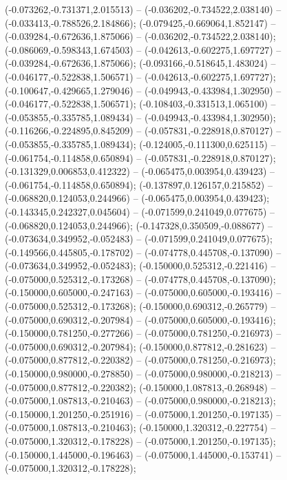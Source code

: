  (-0.073262,-0.731371,2.015513) -- (-0.036202,-0.734522,2.038140) -- (-0.033413,-0.788526,2.184866);
 (-0.079425,-0.669064,1.852147) -- (-0.039284,-0.672636,1.875066) -- (-0.036202,-0.734522,2.038140);
 (-0.086069,-0.598343,1.674503) -- (-0.042613,-0.602275,1.697727) -- (-0.039284,-0.672636,1.875066);
 (-0.093166,-0.518645,1.483024) -- (-0.046177,-0.522838,1.506571) -- (-0.042613,-0.602275,1.697727);
 (-0.100647,-0.429665,1.279046) -- (-0.049943,-0.433984,1.302950) -- (-0.046177,-0.522838,1.506571);
 (-0.108403,-0.331513,1.065100) -- (-0.053855,-0.335785,1.089434) -- (-0.049943,-0.433984,1.302950);
 (-0.116266,-0.224895,0.845209) -- (-0.057831,-0.228918,0.870127) -- (-0.053855,-0.335785,1.089434);
 (-0.124005,-0.111300,0.625115) -- (-0.061754,-0.114858,0.650894) -- (-0.057831,-0.228918,0.870127);
 (-0.131329,0.006853,0.412322) -- (-0.065475,0.003954,0.439423) -- (-0.061754,-0.114858,0.650894);
 (-0.137897,0.126157,0.215852) -- (-0.068820,0.124053,0.244966) -- (-0.065475,0.003954,0.439423);
 (-0.143345,0.242327,0.045604) -- (-0.071599,0.241049,0.077675) -- (-0.068820,0.124053,0.244966);
 (-0.147328,0.350509,-0.088677) -- (-0.073634,0.349952,-0.052483) -- (-0.071599,0.241049,0.077675);
 (-0.149566,0.445805,-0.178702) -- (-0.074778,0.445708,-0.137090) -- (-0.073634,0.349952,-0.052483);
 (-0.150000,0.525312,-0.221416) -- (-0.075000,0.525312,-0.173268) -- (-0.074778,0.445708,-0.137090);
 (-0.150000,0.605000,-0.247163) -- (-0.075000,0.605000,-0.193416) -- (-0.075000,0.525312,-0.173268);
 (-0.150000,0.690312,-0.265779) -- (-0.075000,0.690312,-0.207984) -- (-0.075000,0.605000,-0.193416);
 (-0.150000,0.781250,-0.277266) -- (-0.075000,0.781250,-0.216973) -- (-0.075000,0.690312,-0.207984);
 (-0.150000,0.877812,-0.281623) -- (-0.075000,0.877812,-0.220382) -- (-0.075000,0.781250,-0.216973);
 (-0.150000,0.980000,-0.278850) -- (-0.075000,0.980000,-0.218213) -- (-0.075000,0.877812,-0.220382);
 (-0.150000,1.087813,-0.268948) -- (-0.075000,1.087813,-0.210463) -- (-0.075000,0.980000,-0.218213);
 (-0.150000,1.201250,-0.251916) -- (-0.075000,1.201250,-0.197135) -- (-0.075000,1.087813,-0.210463);
 (-0.150000,1.320312,-0.227754) -- (-0.075000,1.320312,-0.178228) -- (-0.075000,1.201250,-0.197135);
 (-0.150000,1.445000,-0.196463) -- (-0.075000,1.445000,-0.153741) -- (-0.075000,1.320312,-0.178228);
